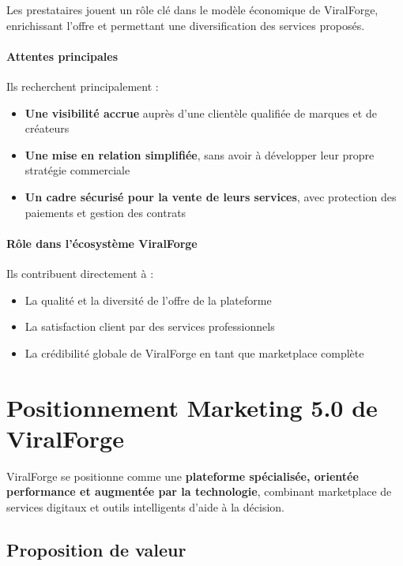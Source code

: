 Les prestataires jouent un rôle clé dans le modèle économique de ViralForge, enrichissant l'offre et permettant une diversification des services proposés.

\paragraph{Attentes principales}

Ils recherchent principalement :
\begin{itemize}
    \item \textbf{Une visibilité accrue} auprès d'une clientèle qualifiée de marques et de créateurs
    \item \textbf{Une mise en relation simplifiée}, sans avoir à développer leur propre stratégie commerciale
    \item \textbf{Un cadre sécurisé pour la vente de leurs services}, avec protection des paiements et gestion des contrats
\end{itemize}

\paragraph{Rôle dans l'écosystème ViralForge}

Ils contribuent directement à :
\begin{itemize}
    \item La qualité et la diversité de l'offre de la plateforme
    \item La satisfaction client par des services professionnels
    \item La crédibilité globale de ViralForge en tant que marketplace complète
\end{itemize}

\newpage

\section{Positionnement Marketing 5.0 de ViralForge}

ViralForge se positionne comme une \textbf{plateforme spécialisée, orientée performance et augmentée par la technologie}, combinant marketplace de services digitaux et outils intelligents d'aide à la décision.

\subsection{Proposition de valeur}


